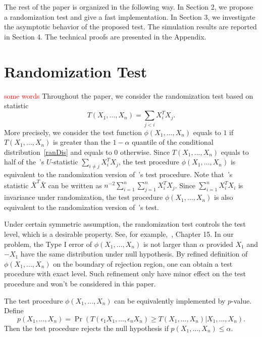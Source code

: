 \documentclass[review]{elsarticle}
\theoremstyle{plain}
\theoremstyle{definition}
\theoremstyle{remark}
\begin{document}
The rest of the paper is organized in the following way. In Section 2, we propose a randomization test and give a fast implementation.  In Section 3, we investigate the asymptotic behavior of the proposed test. The simulation results are reported in Section 4. The technical proofs are presented in the Appendix.




\section{Randomization Test}
\textcolor{red}{some words}
Throughout the paper, we consider the randomization test based on statistic
\begin{equation}\label{Statistic}
    T(X_1,\ldots,X_n)=\sum_{j<i}X_i^T X_j.
\end{equation}
More precisely, we consider the test function $\phi(X_1,\ldots,X_n)$ equals to $1$ if $T(X_1,\ldots, X_n)$ is greater than the $1-\alpha$ quantile of the conditional distribution~\eqref{ranDis} and equals to $0$ otherwise.
 Since $T(X_1,\ldots,X_n)$ equals to half of the~\cite{Chen2010A}'s $U$-statistic $\sum_{i\neq j}X_i^T X_j$, the test procedure $\phi(X_1,\ldots,X_n)$ is equivalent to the randomization version of~\cite{Chen2010A}'s test procedure.
 Note that~\cite{Bai1996Efiect}'s statistic $\bar{X}^T \bar{X}$ can be written as $n^{-2}\sum_{i=1}^n\sum_{j=1}^n X_i^T X_j$.
 Since $\sum_{i=1}^n X_i^T X_i$ is invariance under randomization, the test procedure $\phi(X_1,\ldots,X_n)$ is also equivalent to the randomization version of~\cite{Bai1996Efiect}'s test.

Under certain symmetric assumption, the randomization test controls the test level, which is a desirable property.
 See, for example,~\cite{Lehmann}, Chapter 15.
In our problem, the Type I error of $\phi(X_1,\ldots,X_n)$ is not larger than $\alpha$ provided $X_1$ and $-X_1$ have the same distribution under null hypothesis.
 By refined definition of $\phi(X_1,\ldots,X_n)$ on the boundary of rejection region, one can obtain a test procedure with exact level. 
Such refinement only have minor effect on the test procedure and won't be considered in this paper.

The test procedure $\phi(X_1,\ldots, X_n)$ can be equivalently implemented by $p$-value. Define 
\begin{equation}\label{firstPvalue}
    p(X_1,\ldots, X_n)=
    \Pr(T(\epsilon_1 X_1,\ldots,\epsilon_n X_n)\geq T( X_1,\ldots,X_n)|X_1,\ldots,X_n).
\end{equation}
Then the test procedure rejects the null hypothesis if $p(X_1,\ldots, X_n)\leq \alpha$. 
\end{document}
